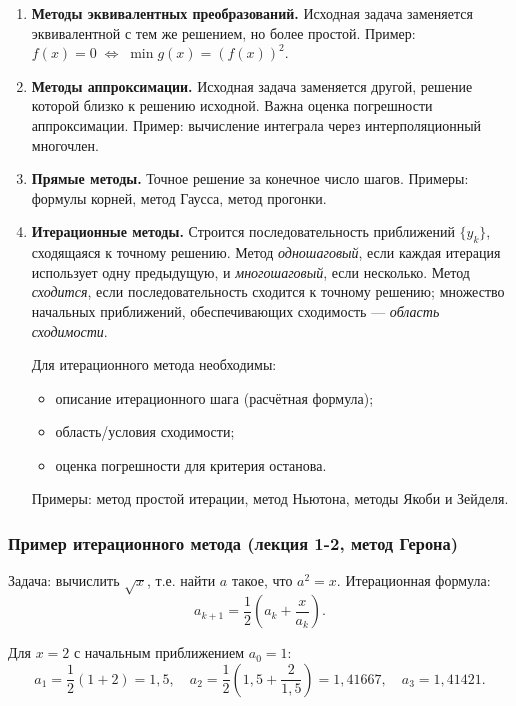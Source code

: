 \begin{enumerate}
    \item \textbf{Методы эквивалентных преобразований.} Исходная задача заменяется эквивалентной с тем же решением, но более простой. Пример: $f(x) = 0 \;\Leftrightarrow\; \min g(x) = (f(x))^2$.

    \item \textbf{Методы аппроксимации.} Исходная задача заменяется другой, решение которой близко к решению исходной. Важна оценка погрешности аппроксимации. Пример: вычисление интеграла через интерполяционный многочлен.

    \item \textbf{Прямые методы.} Точное решение за конечное число шагов. Примеры: формулы корней, метод Гаусса, метод прогонки.

    \item \textbf{Итерационные методы.} Строится последовательность приближений $\{y_k\}$, сходящаяся к точному решению. Метод \textit{одношаговый}, если каждая итерация использует одну предыдущую, и \textit{многошаговый}, если несколько. Метод \textit{сходится}, если последовательность сходится к точному решению; множество начальных приближений, обеспечивающих сходимость --- \textit{область сходимости}.

    Для итерационного метода необходимы:
    \begin{itemize}
        \item описание итерационного шага (расчётная формула);
        \item область/условия сходимости;
        \item оценка погрешности для критерия останова.
    \end{itemize}

    Примеры: метод простой итерации, метод Ньютона, методы Якоби и Зейделя.
\end{enumerate}

\subsubsection*{Пример итерационного метода (лекция 1-2, метод Герона)}

Задача: вычислить $\sqrt{x}$, т.е. найти $a$ такое, что $a^2 = x$. Итерационная формула:
\[
    a_{k+1} = \frac{1}{2}\left(a_k + \frac{x}{a_k}\right).
\]

Для $x = 2$ с начальным приближением $a_0 = 1$:
\[
    a_1 = \frac{1}{2}\left(1 + 2\right) = 1{,}5, \quad
    a_2 = \frac{1}{2}\left(1{,}5 + \frac{2}{1{,}5}\right) = 1{,}41667, \quad
    a_3 = 1{,}41421.
\]

